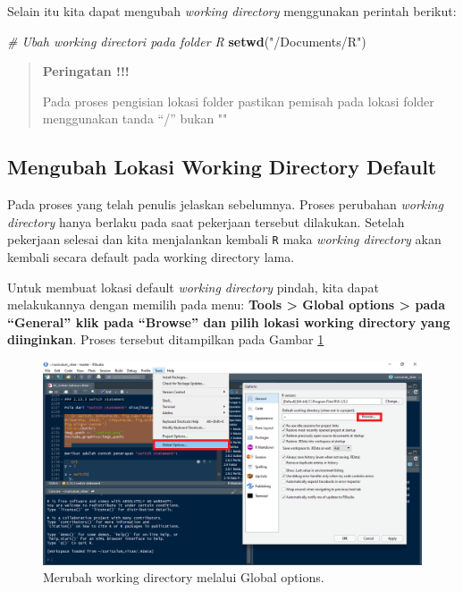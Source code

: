 \documentclass[]{book}
\newenvironment{Shaded}{\begin{snugshade}}{\end{snugshade}}
\newcommand{\CommentTok}[1]{\textcolor[rgb]{0.56,0.35,0.01}{\textit{#1}}}
\newcommand{\KeywordTok}[1]{\textcolor[rgb]{0.13,0.29,0.53}{\textbf{#1}}}
\newcommand{\NormalTok}[1]{#1}
\newcommand{\StringTok}[1]{\textcolor[rgb]{0.31,0.60,0.02}{#1}}
\theoremstyle{definition}
\theoremstyle{definition}
\theoremstyle{definition}
\theoremstyle{remark}
\begin{document}
Selain itu kita dapat mengubah \emph{working directory} menggunakan perintah berikut:

\begin{Shaded}
\begin{Highlighting}[]
\CommentTok{# Ubah working directori pada folder R}
\KeywordTok{setwd}\NormalTok{(}\StringTok{"/Documents/R"}\NormalTok{)}
\end{Highlighting}
\end{Shaded}

\begin{quote}
\textbf{Peringatan !!!}

Pada proses pengisian lokasi folder pastikan pemisah pada lokasi folder menggunakan tanda ``/'' bukan ""
\end{quote}

\hypertarget{defaultwdR}{%
\subsection{Mengubah Lokasi Working Directory Default}\label{defaultwdR}}

Pada proses yang telah penulis jelaskan sebelumnya. Proses perubahan \emph{working directory} hanya berlaku pada saat pekerjaan tersebut dilakukan. Setelah pekerjaan selesai dan kita menjalankan kembali \texttt{R} maka \emph{working directory} akan kembali secara default pada working directory lama.

Untuk membuat lokasi default \emph{working directory} pindah, kita dapat melakukannya dengan memilih pada menu: \textbf{Tools \textgreater{} Global options \textgreater{} pada ``General'' klik pada ``Browse'' dan pilih lokasi working directory yang diinginkan}. Proses tersebut ditampilkan pada Gambar \ref{fig:default}

\begin{figure}

{\centering \includegraphics[width=0.8\linewidth]{./images/default} 

}

\caption{Merubah working directory melalui Global options.}\label{fig:default}
\end{figure}
\end{document}
